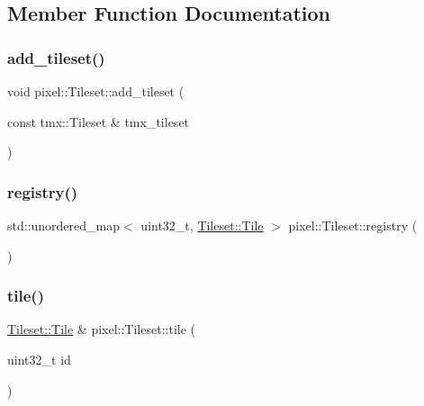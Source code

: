 \subsection{Member Function Documentation}
\mbox{\label{classpixel_1_1_tileset_a9c4bbb518051280dbce888b7e6393d16}} 
\subsubsection{\texorpdfstring{add\+\_\+tileset()}{add\_tileset()}}
{\footnotesize\ttfamily void pixel\+::\+Tileset\+::add\+\_\+tileset (\begin{DoxyParamCaption}\item[{const tmx\+::\+Tileset \&}]{tmx\+\_\+tileset }\end{DoxyParamCaption})}

\mbox{\label{classpixel_1_1_tileset_a762d3d382fdc40375f1c3f224d7e6cad}} 
\subsubsection{\texorpdfstring{registry()}{registry()}}
{\footnotesize\ttfamily std\+::unordered\+\_\+map$<$ uint32\+\_\+t, \hyperlink{structpixel_1_1_tileset_1_1_tile}{Tileset\+::\+Tile} $>$ pixel\+::\+Tileset\+::registry (\begin{DoxyParamCaption}{ }\end{DoxyParamCaption})}

\mbox{\label{classpixel_1_1_tileset_ac0eca2f1fbe3ad309d8bc199311a5459}} 
\subsubsection{\texorpdfstring{tile()}{tile()}}
{\footnotesize\ttfamily \hyperlink{structpixel_1_1_tileset_1_1_tile}{Tileset\+::\+Tile} \& pixel\+::\+Tileset\+::tile (\begin{DoxyParamCaption}\item[{uint32\+\_\+t}]{id }\end{DoxyParamCaption})}

